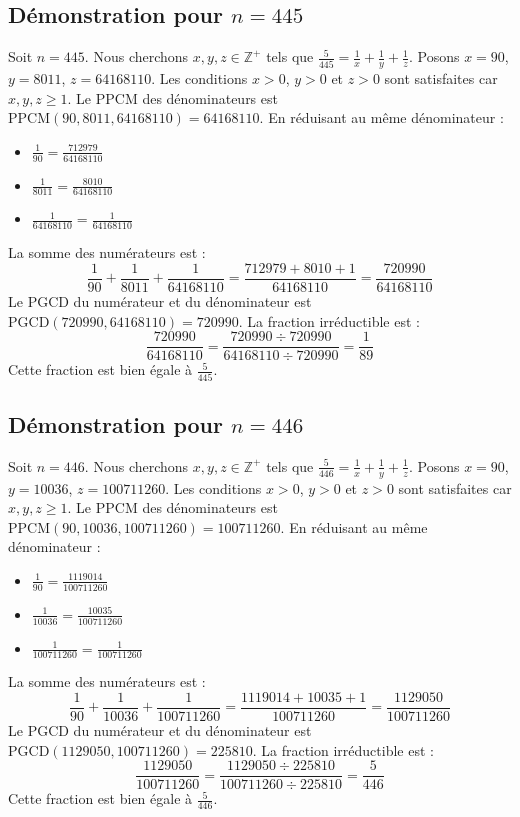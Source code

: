 \documentclass[11pt,a4paper]{article}
\begin{document}
\subsection{Démonstration pour $n = 445$}
Soit $n = 445$. Nous cherchons $x, y, z \in \mathbb{Z}^{+}$ tels que $\frac{5}{445} = \frac{1}{x} + \frac{1}{y} + \frac{1}{z}$.
Posons $x = 90$, $y = 8011$, $z = 64168110$.
Les conditions $x > 0$, $y > 0$ et $z > 0$ sont satisfaites car $x, y, z \geq 1$.
Le PPCM des dénominateurs est $\text{PPCM}(90, 8011, 64168110) = 64168110$.
En réduisant au même dénominateur :
\begin{itemize}
    \item $\frac{1}{90} = \frac{712979}{64168110}$
    \item $\frac{1}{8011} = \frac{8010}{64168110}$
    \item $\frac{1}{64168110} = \frac{1}{64168110}$
\end{itemize}
La somme des numérateurs est :
$$ \frac{1}{90} + \frac{1}{8011} + \frac{1}{64168110} = \frac{712979 + 8010 + 1}{64168110} = \frac{720990}{64168110} $$
Le PGCD du numérateur et du dénominateur est $\text{PGCD}(720990, 64168110) = 720990$.
La fraction irréductible est :
$$ \frac{720990}{64168110} = \frac{720990 \div 720990}{64168110 \div 720990} = \frac{1}{89} $$
Cette fraction est bien égale à $\frac{5}{445}$.

\subsection{Démonstration pour $n = 446$}
Soit $n = 446$. Nous cherchons $x, y, z \in \mathbb{Z}^{+}$ tels que $\frac{5}{446} = \frac{1}{x} + \frac{1}{y} + \frac{1}{z}$.
Posons $x = 90$, $y = 10036$, $z = 100711260$.
Les conditions $x > 0$, $y > 0$ et $z > 0$ sont satisfaites car $x, y, z \geq 1$.
Le PPCM des dénominateurs est $\text{PPCM}(90, 10036, 100711260) = 100711260$.
En réduisant au même dénominateur :
\begin{itemize}
    \item $\frac{1}{90} = \frac{1119014}{100711260}$
    \item $\frac{1}{10036} = \frac{10035}{100711260}$
    \item $\frac{1}{100711260} = \frac{1}{100711260}$
\end{itemize}
La somme des numérateurs est :
$$ \frac{1}{90} + \frac{1}{10036} + \frac{1}{100711260} = \frac{1119014 + 10035 + 1}{100711260} = \frac{1129050}{100711260} $$
Le PGCD du numérateur et du dénominateur est $\text{PGCD}(1129050, 100711260) = 225810$.
La fraction irréductible est :
$$ \frac{1129050}{100711260} = \frac{1129050 \div 225810}{100711260 \div 225810} = \frac{5}{446} $$
Cette fraction est bien égale à $\frac{5}{446}$.
\end{document}
